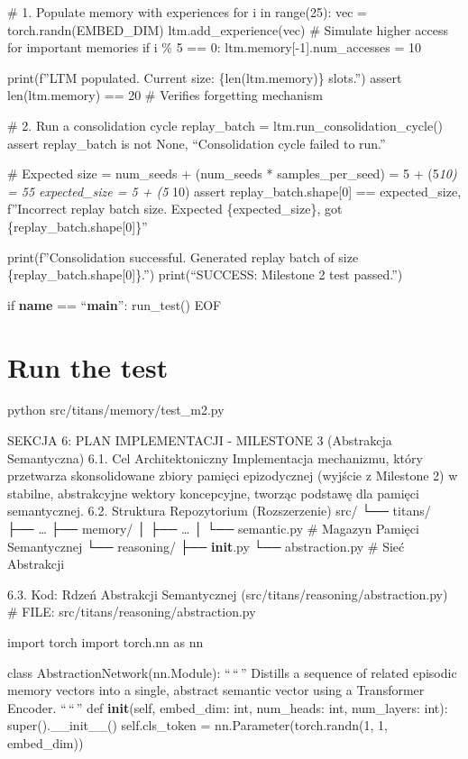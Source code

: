\documentclass[letterpaper,twocolumn]{article}
\begin{document}
\# 1. Populate memory with experiences for i in range(25): vec =
torch.randn(EMBED\_DIM) ltm.add\_experience(vec) \# Simulate higher
access for important memories if i \% 5 == 0:
ltm.memory{[}-1{]}.num\_accesses = 10

print(f''LTM populated. Current size: \{len(ltm.memory)\} slots.'')
assert len(ltm.memory) == 20 \# Verifies forgetting mechanism

\# 2. Run a consolidation cycle replay\_batch =
ltm.run\_consolidation\_cycle() assert replay\_batch is not None,
``Consolidation cycle failed to run.''

\# Expected size = num\_seeds + (num\_seeds * samples\_per\_seed) = 5 +
(5\emph{10) = 55 expected\_size = 5 + (5 } 10) assert
replay\_batch.shape{[}0{]} == expected\_size, f''Incorrect replay batch
size. Expected \{expected\_size\}, got \{replay\_batch.shape{[}0{]}\}''

print(f''Consolidation successful. Generated replay batch of size
\{replay\_batch.shape{[}0{]}\}.'') print(``SUCCESS: Milestone 2 test
passed.'')

if \textbf{name} == ``\textbf{main}'': run\_test() EOF

\hypertarget{run-the-test}{%
\section{Run the test}\label{run-the-test}}

python src/titans/memory/test\_m2.py

SEKCJA 6: PLAN IMPLEMENTACJI - MILESTONE 3 (Abstrakcja Semantyczna) 6.1.
Cel Architektoniczny Implementacja mechanizmu, który przetwarza
skonsolidowane zbiory pamięci epizodycznej (wyjście z Milestone 2) w
stabilne, abstrakcyjne wektory koncepcyjne, tworząc podstawę dla pamięci
semantycznej. 6.2. Struktura Repozytorium (Rozszerzenie) src/ └──
titans/ ├── \ldots{} ├── memory/ │ ├── \ldots{} │ └── semantic.py \#
Magazyn Pamięci Semantycznej └── reasoning/ ├── \textbf{init}.py └──
abstraction.py \# Sieć Abstrakcji

6.3. Kod: Rdzeń Abstrakcji Semantycznej
(src/titans/reasoning/abstraction.py) \# FILE:
src/titans/reasoning/abstraction.py

import torch import torch.nn as nn

class AbstractionNetwork(nn.Module): ``\,``\,'' Distills a sequence of
related episodic memory vectors into a single, abstract semantic vector
using a Transformer Encoder. ``\,``\,'' def \textbf{init}(self,
embed\_dim: int, num\_heads: int, num\_layers: int):
super().\_\_init\_\_() self.cls\_token = nn.Parameter(torch.randn(1, 1,
embed\_dim))
\end{document}
